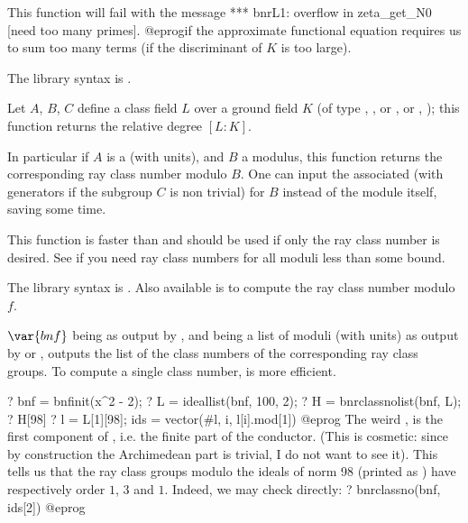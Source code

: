 This function will fail with the message
\bprog
 *** bnrL1: overflow in zeta_get_N0 [need too many primes].
@eprog\noindent if the approximate functional equation requires us to sum
too many terms (if the discriminant of $K$ is too large).

The library syntax is .

\label{se:bnrclassno}
Let $A$, $B$, $C$ define a class field $L$ over a ground field $K$
(of type ,
,
or ,
or ,
); this function returns the relative degree $[L:K]$.

In particular if $A$ is a  (with units), and $B$ a modulus,
this function returns the corresponding ray class number modulo $B$.
One can input the associated  (with generators if the subgroup
$C$ is non trivial) for $B$ instead of the module itself, saving some time.

This function is faster than  and should be used if only the
ray class number is desired. See  if you need ray class
numbers for all moduli less than some bound.

The library syntax is .
Also available is
 to compute the ray class number
modulo~$f$.

\label{se:bnrclassnolist}
$\var{bnf}$ being as
output by , and  being a list of moduli (with units) as
output by  or , outputs the list of the
class numbers of the corresponding ray class groups. To compute a single
class number,  is more efficient.

\bprog
? bnf = bnfinit(x^2 - 2);
? L = ideallist(bnf, 100, 2);
? H = bnrclassnolist(bnf, L);
? H[98]
? l = L[1][98]; ids = vector(#l, i, l[i].mod[1])
@eprog
The weird , is the first component of , i.e.
the finite part of the conductor. (This is cosmetic: since by construction
the Archimedean part is trivial, I do not want to see it). This tells us that
the ray class groups modulo the ideals of norm 98 (printed as ) have
respectively order $1$, $3$ and $1$. Indeed, we may check directly:
\bprog
? bnrclassno(bnf, ids[2])
@eprog


